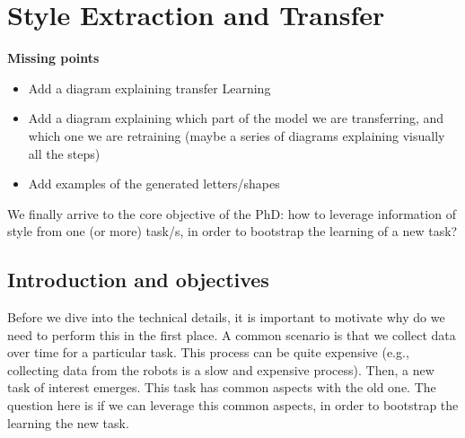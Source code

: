 \chapter{Style Extraction and Transfer} \label{ch:seat}
\minitoc%

\textbf{Missing points}
\begin{itemize}
  \item Add a diagram explaining transfer Learning
  \item Add a diagram explaining which part of the model we are transferring, and which one we are retraining (maybe a series of diagrams explaining visually all the steps)
  \item Add examples of the generated letters/shapes
\end{itemize}

\par We finally arrive to the core objective of the PhD: how to leverage information of style from one (or more) \Gls{task}/s, in order to bootstrap the learning of a new task?

\clearpage

\section{Introduction and objectives}

  \par Before we dive into the technical details, it is important to motivate why do we need to perform this in the first place. A common scenario is that we collect data over time for a particular task. This process can be quite expensive (e.g., collecting data from the robots is a slow and expensive process). Then, a new task of interest emerges. This task has common aspects with the old one. The question here is if we can leverage this common aspects, in order to bootstrap the learning the new task.

